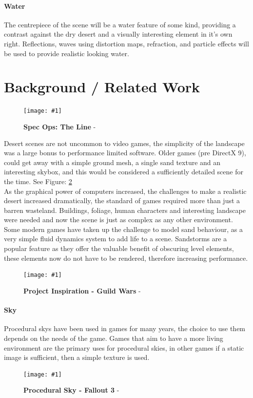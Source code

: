 \documentclass[conference]{acmsiggraph}
\newcommand{\figuremacroW}[4]{
	\begin{figure}[h] %
		\centering
		\texttt{[image: \#1]}
		\caption[#2]{\textbf{#2} - #3}
		\label{fig:#1}
	\end{figure}
}
\begin{document}
\paragraph{Water}
The centrepiece of the scene will be a water feature of some kind, providing a contrast against the dry desert and a visually interesting element in it's own right. Reflections, waves using distortion maps, refraction, and particle effects will be used to provide realistic looking water. 

\section{Background / Related Work}
\figuremacroW
{specops}
{Spec Ops: The Line}
{\protect\cite{spec}}
{1.0}
Desert scenes are not uncommon to video games, the  simplicity of the landscape was a large bonus to performance limited software.
Older games (pre DirectX 9), could get away with a simple ground mesh, a single sand texture and an interesting skybox, and this would be considered a sufficiently detailed scene for the time. See Figure: \ref{fig:GuildWars}
\\
As the graphical power of computers increased, the challenges to make a realistic desert increased dramatically, the standard of games required more than just a barren wasteland. Buildings, foliage, human characters and interesting landscape were needed and now the scene is just as complex as any other environment.
Some modern games have taken up the challenge to model sand behaviour, as a very simple fluid dynamics system to add life to a scene. Sandstorms are a popular feature as they offer the valuable benefit of obscuring level elements, these elements now do not have to be rendered, therefore increasing performance.

\figuremacroW
{GuildWars}
{Project Inspiration - Guild Wars}
{\protect\cite{GuildWars}}
{1.0}

\paragraph{Sky}
Procedural skys have been used in games for many years, the choice to use them depends on the needs of the game.  Games that aim to have a more living environment are the primary uses for procedural skies, in other games if a static image is sufficient, then a simple texture is used.
 
\figuremacroW
{fallout3}
{Procedural Sky - Fallout 3}
{\protect\cite{fallout3}}
{1.0}
\end{document}
